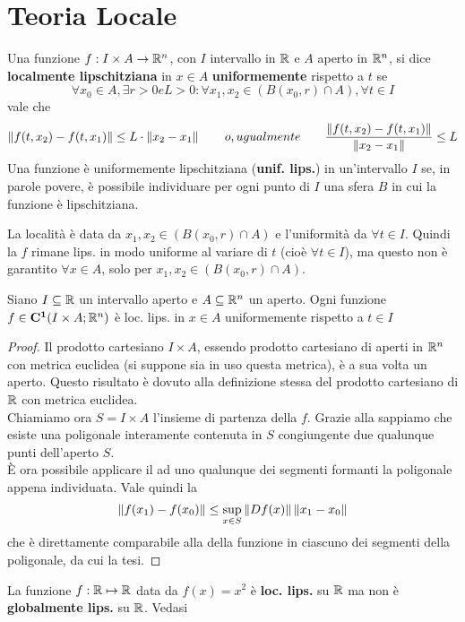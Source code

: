 \section{Teoria Locale}
\begin{definition}
	\label{def:loc_lips}
	Una funzione $f:I\times A\to \mathbb{R}^n$, con $I$ intervallo in $\mathbb{R}$ e $A$ aperto in $\mathbb{R}^n$, si dice \textbf{localmente lipschitziana} in $x\in A$ \textbf{uniformemente} rispetto a $t$ se
	$$\forall x_0 \in A, \exists r>0 e L>0: \forall x_1,x_2 \in (B(x_0,r)\cap A), \forall t\in I$$
	vale che
	$$\left\|f(t,x_2)-f(t,x_1)\right\|\leq L\cdot\left\|x_2-x_1\right\|\qquad o, ugualmente\qquad\frac{\left\|f(t,x_2)-f(t,x_1)\right\|}{\left\|x_2-x_1\right\|}\leq L$$
	Una funzione è uniformemente lipschitziana (\textbf{unif. lips.}) in un'intervallo $I$ se, in parole povere, è possibile individuare per ogni punto di $I$ una sfera $B$ in cui la funzione è lipschitziana.
\end{definition}
\begin{note}
	La località è data da $x_1,x_2 \in (B(x_0,r)\cap A)$ e l'uniformità da $\forall t\in I$. Quindi la $f$ rimane lips. in modo uniforme al variare di $t$ (cioè $\forall t\in I$), ma questo non è garantito $\forall x\in A$, solo per $x_1,x_2 \in (B(x_0,r)\cap A)$.
\end{note}
\begin{proposition}
	\label{prop:fc1_loc_lips}
	Siano $I\subseteq \mathbb{R}$ un intervallo aperto e $A\subseteq \mathbb{R}^n$ un aperto. Ogni funzione $f\in\mathbf{C^{1}}(I\times A;\mathbb{R}^n)$ è loc. lips. in $x\in A$ uniformemente rispetto a $t\in I$
	\begin{proof}
		Il prodotto cartesiano $I\times A$, essendo prodotto cartesiano di aperti in $\mathbb{R}^n$ con metrica euclidea (si suppone sia in uso questa metrica), è a sua volta un aperto. Questo risultato è dovuto alla definizione stessa del prodotto cartesiano di $\mathbb{R}$ con metrica euclidea.\\
		Chiamiamo ora $S=I\times A$ l'insieme di partenza della $f$. Grazie alla  sappiamo che esiste una poligonale interamente contenuta in $S$ congiungente due qualunque punti dell'aperto $S$.\\
		È ora possibile applicare il  ad uno qualunque dei segmenti formanti la poligonale appena individuata. Vale quindi la
		$$\left\|f(x_1)-f(x_0)\right\|\le \sup\limits_{x\in S}\left\|Df(x)\right\|\left\|x_1-x_0\right\|$$
		che è direttamente comparabile alla  della funzione in ciascuno dei segmenti della poligonale, da cui la tesi.
	\end{proof}
\end{proposition}
\begin{example}
	La funzione $f:\mathbb{R}\mapsto\mathbb{R}$ data da $f(x)=x^2$ è \textbf{loc. lips.} su $\mathbb{R}$ ma non è \textbf{globalmente lips.} su $\mathbb{R}$. Vedasi 
\end{example}

